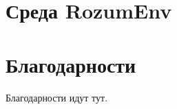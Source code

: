 \documentclass{mipt-thesis-bs}
\begin{document}
\chapter{Среда RozumEnv}


\backmatter


\chapter{Благодарности}

Благодарности идут тут.
\end{document}
